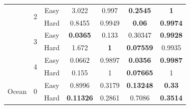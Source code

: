 \documentclass{svproc}
\begin{document}
\begin{table}[h]
\begin{center}
\begin{tabular}{ccccccc}
                                   &  \multirow{2}{*}{2}   &  \multicolumn{1}{c}{Easy}  & \multicolumn{1}{c}{3.022} & \multicolumn{1}{c}{0.997} & \multicolumn{1}{c}{\textbf{0.2545}}  & \multicolumn{1}{c}{\textbf{1}}   \\
  \cline{3-7}
                                                          & \multicolumn{1}{c}{} &  \multicolumn{1}{c}{Hard}  & \multicolumn{1}{c}{0.8455} & \multicolumn{1}{c}{0.9949} & \multicolumn{1}{c}{\textbf{0.06}}  & \multicolumn{1}{c}{\textbf{0.9974}}   \\
  \cline{2-7}
                                    &  \multirow{2}{*}{3}   &  \multicolumn{1}{c}{Easy}  & \multicolumn{1}{c}{\textbf{0.0365}} & \multicolumn{1}{c}{0.133} & \multicolumn{1}{c}{0.30347}  & \multicolumn{1}{c}{\textbf{0.9928}}   \\
  \cline{3-7}
                                                          & \multicolumn{1}{c}{} &  \multicolumn{1}{c}{Hard}  & \multicolumn{1}{c}{1.672} & \multicolumn{1}{c}{\textbf{1}} & \multicolumn{1}{c}{\textbf{0.07559}}  & \multicolumn{1}{c}{0.9935}   \\
  \cline{2-7}
                                    &  \multirow{2}{*}{4}   &  \multicolumn{1}{c}{Easy}  & \multicolumn{1}{c}{0.0662} & \multicolumn{1}{c}{0.9897} & \multicolumn{1}{c}{\textbf{0.0356}}  & \multicolumn{1}{c}{\textbf{0.9987}}   \\
  \cline{3-7}
                                                          & \multicolumn{1}{c}{} &  \multicolumn{1}{c}{Hard}  & \multicolumn{1}{c}{0.155} & \multicolumn{1}{c}{1} & \multicolumn{1}{c}{\textbf{0.07665}}  & \multicolumn{1}{c}{1}   \\
 \cline{1-7}

\multirow{8}{*}{Ocean}   &  \multirow{2}{*}{0}   &  \multicolumn{1}{c}{Easy}  & \multicolumn{1}{c}{0.8996} & \multicolumn{1}{c}{0.3179} & \multicolumn{1}{c}{\textbf{0.13248}}  & \multicolumn{1}{c}{\textbf{0.33}  } \\
  \cline{3-7}

                                                         & \multicolumn{1}{c}{}  &  \multicolumn{1}{c}{Hard}  & \multicolumn{1}{c}{\textbf{0.11326}} & \multicolumn{1}{c}{0.2861} & \multicolumn{1}{c}{0.7086}  & \multicolumn{1}{c}{\textbf{0.3514}}   \\
  \cline{2-7}


\end{tabular}
\end{center}
\end{table}
\end{document}
